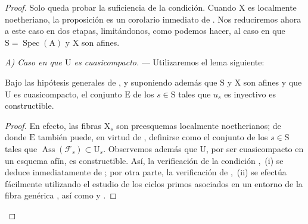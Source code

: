 \begin{proof}
Solo queda probar la suficiencia de la condición.
Cuando $\mathrm{X}$ es localmente noetheriano, la proposición es un corolario inmediato de .
Nos reduciremos ahora a este caso en dos etapas, limitándonos, como podemos hacer, al caso en que $\mathrm{S}=\operatorname{Spec}(\mathrm{A})$ y $\mathrm{X}$ son afines.
\medskip

\emph{A) Caso en que $\mathrm{U}$ es cuasicompacto.} --- Utilizaremos el lema siguiente:

\begin{lemma}[11.9.17.1]
\label{IV.11.9.17.1}
Bajo las hipótesis generales de , y suponiendo además que $\mathrm{S}$ y $\mathrm{X}$ son afines y que $\mathrm{U}$ es cuasicompacto, el conjunto $\mathrm{E}$ de los $s\in\mathrm{S}$ tales que $u_s$ es inyectivo es constructible.
\end{lemma}

\begin{proof}
En efecto, las fibras $\mathrm{X}_s$ son preesquemas localmente noetherianos; de donde $\mathrm{E}$ también puede, en virtud de , definirse como el conjunto de los $s\in\mathrm{S}$ tales que $\operatorname{Ass}(\mathscr{F}_s)\subset\mathrm{U}_s$.
Observemos además que $\mathrm{U}$, por ser cuasicompacto en un esquema afín, es constructible. Así, la verificación de la condición ,~(i) se deduce inmediatamente de ; por otra parte, la
verificación de ,~(ii) se efectúa fácilmente utilizando el estudio de los ciclos primos asociados en un entorno de la fibra genérica , así como  y .
\end{proof}


\end{proof}
